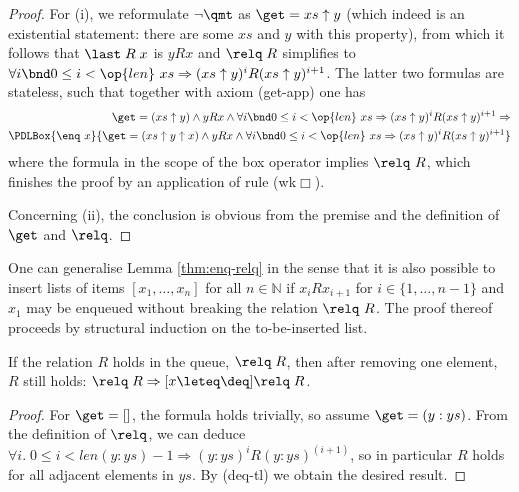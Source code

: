 \begin{proof} 
  For (i), we reformulate $\lnot \qmt$ as $\get = xs\uparrow y$ (which indeed is an
  existential statement: there are some $xs$ and $y$ with this property), from
  which it follows that $\last\;R\;x$ is $yRx$ and $\relq\;R$ simplifies to 
  $\forall i\bnd 0\leq i<\op{len}\ xs \Rightarrow (xs\uparrow y)^iR(xs\uparrow y)^{i+1}$. The latter two formulas
  are stateless, such that together with axiom (get-app) one has
  \begin{equation}\begin{split}\nonumber
 \get = (xs\uparrow y) \land yRx \land \forall i\bnd 0\leq i<\op{len}\ xs \Rightarrow (xs\uparrow y)^iR(xs\uparrow y)^{i+1} \Rightarrow \\
  \PDLBox{\enq\ x}{\get = (xs\uparrow y\uparrow x) \land yRx \land \forall i\bnd 0\leq i<\op{len}\ xs \Rightarrow (xs\uparrow
    y)^iR(xs\uparrow y)^{i+1}}
  \end{split}
  \end{equation}
where the formula in the scope of the box operator implies $\relq\ R$, which finishes
  the proof by an application of rule (wk$\Box$).


  Concerning (ii), the conclusion is obvious from the premise and the definition
  of $\get$ and $\relq$.
\end{proof}


\begin{rem}
\label{rem:ext-enq-relq}
One can generalise Lemma \ref{thm:enq-relq} in the sense that it is also
possible to insert lists of items $[x_1,\ldots ,x_n]$ for all $n \in \mathbb{N}$ if
$x_i R x_{i+1}$ for $i \in \{1,\ldots,n-1 \}$ and $x_1$ may be enqueued without breaking
the relation $\relq\ R$.  The proof thereof proceeds by
structural induction on the to-be-inserted list.
\end{rem}

\begin{lem}
\label{thm:relq-deq}
If the relation $R$ holds in the queue, \IE $\relq\; R$, then after removing one
element, $R$ still holds: $\relq\; R \Rightarrow [x\leteq\deq]\relq\; R$. 
\end{lem}

\begin{proof}
For $\get = []$, the formula holds trivially, so assume $\get = (y: ys)$. From
the definition of $\relq$, we can deduce $\forall i.\; 0\leq i<len (y: ys) - 1 \Rightarrow
(y: ys)^iR(y: ys)^{(i+1)}$, so in particular $R$ holds for all adjacent
elements in $ys$. By (deq-tl) we obtain the desired result.
\end{proof}


